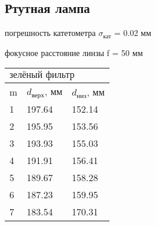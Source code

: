 \documentclass[a4paper, 12pt]{article}
\begin{document}
\subsection{Ртутная лампа}
 погрешность катетометра $\sigma_{кат}$ = 0.02 мм
 \par
 фокусное расстояние линзы f = 50 мм

 \begin{table}[h]
 \centering
\begin{tabular}{|lll|}
\hline
\multicolumn{3}{|l|}{$\text{зелёный фильтр}$}                                               \\ \hline
\multicolumn{1}{|l|}{m} & \multicolumn{1}{l|}{$d_{\text{верх}}$, мм} & $d_{\text{низ}}$, мм \\ \hline
\multicolumn{1}{|l|}{1} & \multicolumn{1}{l|}{197.64}                 & 152.14                \\ \hline
\multicolumn{1}{|l|}{2} & \multicolumn{1}{l|}{195.95}                 & 153.56                \\ \hline
\multicolumn{1}{|l|}{3} & \multicolumn{1}{l|}{193.93}                 & 155.03                \\ \hline
\multicolumn{1}{|l|}{4} & \multicolumn{1}{l|}{191.91}                 & 156.41                \\ \hline
\multicolumn{1}{|l|}{5} & \multicolumn{1}{l|}{189.67}                 & 158.28                \\ \hline
\multicolumn{1}{|l|}{6} & \multicolumn{1}{l|}{187.23}                 & 159.95                \\ \hline
\multicolumn{1}{|l|}{7} & \multicolumn{1}{l|}{183.54}                 & 170.31                \\ \hline
\end{tabular}
\end{table}
\par
\end{document}
